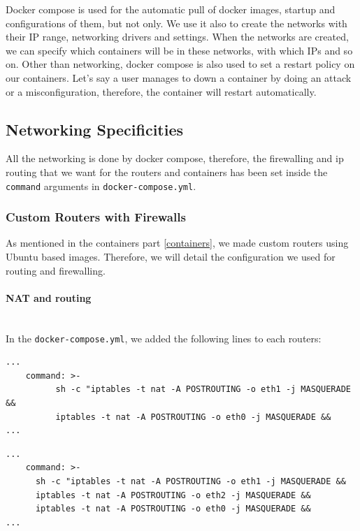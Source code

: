 \documentclass[a4paper,11pt,singlespacing]{article}
\begin{document}
Docker compose is used for the automatic pull of docker images, startup and configurations of them, but not only. We use it also to create the networks with their IP range, networking drivers and settings. When the networks are created, we can specify which containers will be in these networks, with which IPs and so on. Other than networking, docker compose is also used to set a restart policy on our containers. Let's say a user manages to down a container by doing an attack or a misconfiguration, therefore, the container will restart automatically.

\newpage

\subsection{Networking Specificities}
All the networking is done by docker compose, therefore, the firewalling and ip routing that we want for the routers and containers has been set inside the \texttt{command} arguments in \texttt{docker-compose.yml}.

\subsubsection{Custom Routers with Firewalls}
As mentioned in the containers part \ref{containers}, we made custom routers using Ubuntu based images. Therefore, we will detail the configuration we used for routing and firewalling.

\paragraph{NAT and routing}
\leavevmode\\
In the \texttt{docker-compose.yml}, we added the following lines to each routers:
\begin{lstlisting}[caption=DMZ Router External]
...
    command: >-
          sh -c "iptables -t nat -A POSTROUTING -o eth1 -j MASQUERADE &&
          iptables -t nat -A POSTROUTING -o eth0 -j MASQUERADE &&
...
\end{lstlisting}

\begin{lstlisting}[caption=DMZ Router Internal]
...
    command: >-
      sh -c "iptables -t nat -A POSTROUTING -o eth1 -j MASQUERADE &&
      iptables -t nat -A POSTROUTING -o eth2 -j MASQUERADE &&
      iptables -t nat -A POSTROUTING -o eth0 -j MASQUERADE &&
...
\end{lstlisting}
\end{document}
